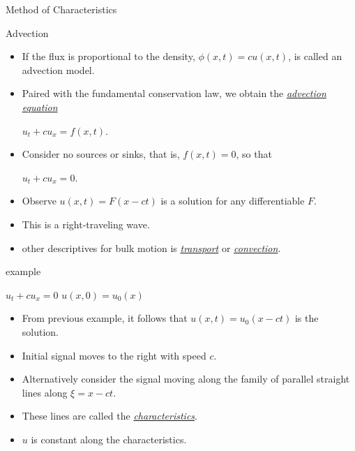 \documentclass[t,10pt,fleqn]{beamer}
\newcommand{\tu}[1]{\underline{\textit{#1}}}
\begin{document}
 \begin{frame}{Method of Characteristics}

 \pause 
 
  \begin{block}{Advection}
  \begin{itemize}
     \pause
     \item If the flux is proportional to the density, $\phi(x,t) = c u(x,t) $, is called an advection model.  
     \pause
     \item Paired with the fundamental conservation law, we obtain the  \tu{advection equation} 
     \begin{center}
            $ u_t + c u_x = f(x,t)$.
     \end{center}
     \pause
     \item Consider no sources or sinks, that is, $f(x,t) =0$, so that 
          \begin{center}
            $ u_t + c u_x =0$.
     \end{center}
          \pause
     \item Observe $u(x,t) = F(x-ct)$ is a solution for any differentiable $F$.
           \pause
     \item This is a right-traveling wave.      
                \pause
     \item other descriptives for bulk motion is \tu{transport} or \tu{convection}.
\end{itemize} 
 
 
\end{block}
 
 
 \end{frame}
 \begin{frame}{}

 \pause 
 
  \begin{block}{example}
            \begin{center}
            $ u_t + c u_x =0$  $u(x,0) = u_0(x)$
     \end{center}
 
  \begin{itemize}
     \pause
     \item From previous example, it follows that $u(x,t) = u_0(x -ct)$ is the solution.  
     \pause
     \item Initial signal moves to the right with speed $c$.  
     \pause
     \item Alternatively consider the signal moving along the family of parallel straight lines along $\xi = x - ct$.  
     \pause
      \item     These lines are called the \tu{characteristics}.     
     \pause
      \item    $u$ is constant along the characteristics.         
        \end{itemize} 
 
 
\end{block}
 
 
 \end{frame}
\end{document}
